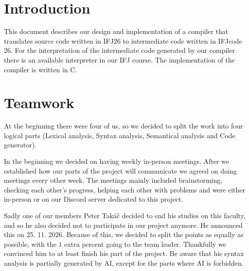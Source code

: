 \documentclass[a4paper]{article}
\begin{document}
\section{Introduction}
This document describes our design and implementation of a compiler
that translates source code written in IFJ26 to intermediate code written in IFJcode 26.
For the interpretation of the intermediate code generated by our compiler
there is an available interpreter in our IFJ course.
The implementation of the compiler is written in C.

\section{Teamwork}
At the beginning there were four of us, so we decided to split the work into four logical parts (Lexical analysis, Syntax analysis, Semantical analysis and Code generator).

In the beginning we decided on having weekly in-person meetings. After we established how our parts of the project will communicate we agreed on doing meetings every other week. The meetings mainly included
brainstorming, checking each other's progress, helping each other with problems and were either in-person or on our Discord server dedicated to this project.

Sadly one of our members Peter Takáč decided to end his studies on this faculty, and so he also decided not to participate in our project anymore. He announced this on 25. 11. 2026.
Because of this, we decided to split the points as equally as possible, with the 1 extra percent going to the team leader. Thankfully we convinced him to at least finish his part of the project. Be aware that his syntax analysis is partially generated by AI, except for the parts where AI is forbidden.
\end{document}
